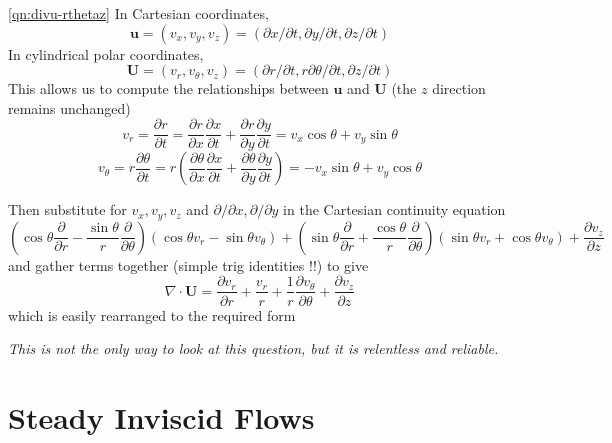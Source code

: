 \documentclass[10pt]{report}
\begin{document}
\begin{answer2}
\begin{questionnumber}{\ref{qn:divu-rthetaz}}
In Cartesian coordinates,
\[
	{\bm u} = \left( v_{x}, v_{y}, v_{z} \right) =
			  \left( \partial x  / \partial t, \partial y  / \partial t, \partial z / \partial t \right)
\]
In cylindrical polar coordinates,
\[
	{\bm U} = \left( v_{r}, v_{\theta}, v_{z} \right) =
			  \left( \partial r  / \partial t, r \partial \theta  / \partial t, \partial z / \partial t \right)
\]
This allows us to compute the relationships between $\bm u$ and $\bm U$ (the $z$ direction remains unchanged)
\[
    v_{r} =  \frac{\partial r}{\partial t} = \frac{\partial r}{\partial x}\frac{\partial x}{\partial t} + \frac{\partial r}{\partial y} \frac{\partial y}{\partial t} = v_{x} \cos\theta + v_{y} \sin\theta
\]
\[
    v_{\theta} = r \frac{\partial \theta}{\partial t} = r \left( \frac{\partial \theta}{\partial x}\frac{\partial x}{\partial t} +  \frac{\partial \theta}{\partial y} \frac{\partial y}{\partial t}\right) = - v_{x} \sin\theta + v_{y} \cos\theta
\]

Then substitute for $v_{x}, v_{y}, v_{z}$ and $\partial/\partial x, \partial/\partial y$ in the Cartesian continuity equation
\[
 \left(\cos\theta \frac{\partial }{\partial r} -
       \frac{\sin\theta}{r}   \frac{\partial }{\partial \theta}\right)
 								\left( \cos\theta v_{r} - \sin\theta v_{\theta} \right) +
 \left( \sin\theta \frac{\partial }{\partial r} +
        \frac{\cos\theta}{r}   \frac{\partial }{\partial \theta} \right)
                                 \left( \sin\theta v_{r} + \cos\theta v_{\theta} \right) +
 \frac{\partial v_{z}}{\partial z}
\]
and gather terms together (simple trig identities !!) to give
\[
   \nabla\cdot{\bm U} = \frac{\partial v_{r}}{\partial r} + \frac{v_{r}}{r} +
               \frac{1}{r}\frac{\partial v_{\theta}}{\partial \theta} +
 \frac{\partial v_{z}}{\partial z}
\]
which is easily rearranged to the required form

\textit{This is not the only way to look at this question, but it is relentless and reliable. }
\end{questionnumber}

\end{answer2}


\cleardoublepage

\chapter{Steady Inviscid Flows}
\end{document}
